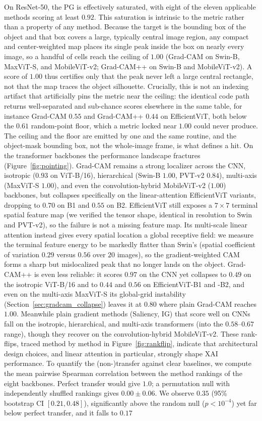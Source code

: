 \documentclass[final,5p,times,twocolumn]{elsarticle}
\begin{document}
On ResNet-50, the PG is effectively saturated, with eight of the eleven applicable methods scoring at least $0.92$. This saturation is intrinsic to the metric rather than a property of any method. Because the target is the bounding box of the object and that box covers a large, typically central image region, any compact and center-weighted map places its single peak inside the box on nearly every image, so a handful of cells reach the ceiling of $1.00$ (Grad-CAM on Swin-B, MaxViT-S, and MobileViT-v2; Grad-CAM++ on Swin-B and MobileViT-v2). A score of $1.00$ thus certifies only that the peak never left a large central rectangle, not that the map traces the object silhouette. Crucially, this is not an indexing artifact that artificially pins the metric near the ceiling: the identical code path returns well-separated and sub-chance scores elsewhere in the same table, for instance Grad-CAM $0.55$ and Grad-CAM++ $0.44$ on EfficientViT, both below the $0.61$ random-point floor, which a metric locked near $1.00$ could never produce. The ceiling and the floor are emitted by one and the same routine, and the object-mask bounding box, not the whole-image frame, is what defines a hit. On the transformer backbones the performance landscape fractures (Figure~\ref{fig:pointing}). Grad-CAM remains a strong localizer across the CNN, isotropic ($0.93$ on ViT-B/16), hierarchical (Swin-B $1.00$, PVT-v2 $0.84$), multi-axis (MaxViT-S $1.00$), and even the convolution-hybrid MobileViT-v2 ($1.00$) backbones, but collapses specifically on the linear-attention EfficientViT variants, dropping to $0.70$ on B1 and $0.55$ on B2. EfficientViT still exposes a $7 \times 7$ terminal spatial feature map (we verified the tensor shape, identical in resolution to Swin and PVT-v2), so the failure is not a missing feature map. Its multi-scale linear attention instead gives every spatial location a global receptive field: we measure the terminal feature energy to be markedly flatter than Swin's (spatial coefficient of variation $0.29$ versus $0.56$ over $20$ images), so the gradient-weighted CAM forms a sharp but mislocalized peak that no longer lands on the object. Grad-CAM++ is even less reliable: it scores $0.97$ on the CNN yet collapses to $0.49$ on the isotropic ViT-B/16 and to $0.44$ and $0.56$ on EfficientViT-B1 and -B2, and even on the multi-axis MaxViT-S its global-grid instability (Section~\ref{sec:gradcam_collapse}) leaves it at $0.80$ where plain Grad-CAM reaches $1.00$. Meanwhile plain gradient methods (Saliency, IG) that score well on CNNs fall on the isotropic, hierarchical, and multi-axis transformers (into the $0.58$--$0.67$ range), though they recover on the convolution-hybrid MobileViT-v2. These rank-flips, traced method by method in Figure~\ref{fig:rankflip}, indicate that architectural design choices, and linear attention in particular, strongly shape XAI performance. To quantify the (non-)transfer against clear baselines, we compute the mean pairwise Spearman correlation between the method rankings of the eight backbones. Perfect transfer would give $1.0$; a permutation null with independently shuffled rankings gives $0.00 \pm 0.06$. We observe $0.35$ (95\% bootstrap CI $[0.21, 0.48]$), significantly above the random null ($p < 10^{-4}$) yet far below perfect transfer, and it falls to $0.17$ 
\end{document}
